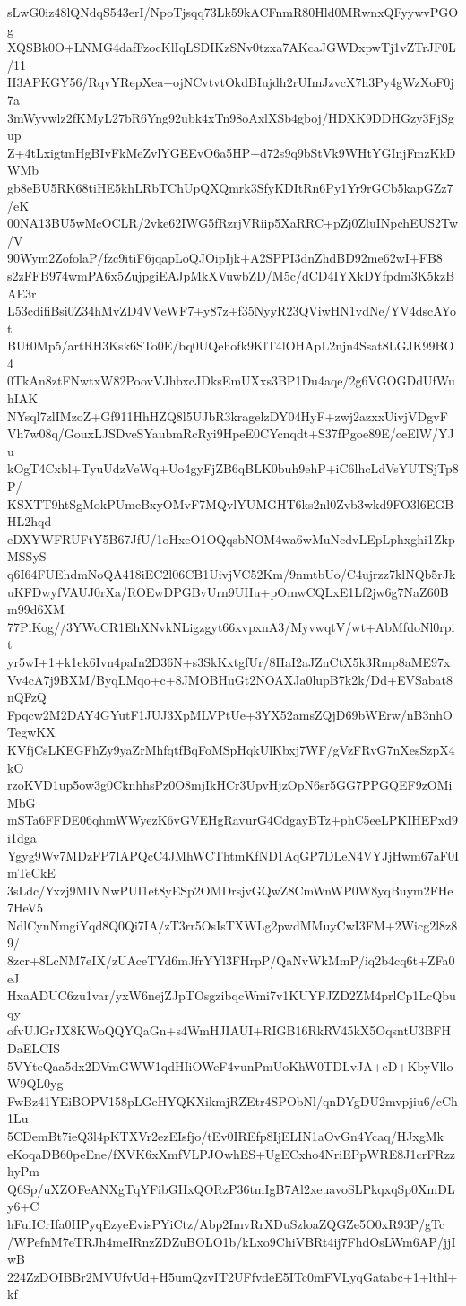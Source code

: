 sLwG0iz48lQNdqS543erI/NpoTjsqq73Lk59kACFnmR80Hld0MRwnxQFyywvPGOg
XQSBk0O+LNMG4dafFzocKlIqLSDIKzSNv0tzxa7AKcaJGWDxpwTj1vZTrJF0L/11
H3APKGY56/RqvYRepXea+ojNCvtvtOkdBIujdh2rUImJzvcX7h3Py4gWzXoF0j7a
3mWyvwlz2fKMyL27bR6Yng92ubk4xTn98oAxlXSb4gboj/HDXK9DDHGzy3FjSgup
Z+4tLxigtmHgBIvFkMeZvlYGEEvO6a5HP+d72s9q9bStVk9WHtYGInjFmzKkDWMb
gb8eBU5RK68tiHE5khLRbTChUpQXQmrk3SfyKDItRn6Py1Yr9rGCb5kapGZz7/eK
00NA13BU5wMcOCLR/2vke62IWG5fRzrjVRiip5XaRRC+pZj0ZluINpchEUS2Tw/V
90Wym2ZofolaP/fzc9itiF6jqapLoQJOipIjk+A2SPPI3dnZhdBD92me62wI+FB8
s2zFFB974wmPA6x5ZujpgiEAJpMkXVuwbZD/M5c/dCD4IYXkDYfpdm3K5kzBAE3r
L53cdifiBsi0Z34hMvZD4VVeWF7+y87z+f35NyyR23QViwHN1vdNe/YV4dscAYot
BUt0Mp5/artRH3Ksk6STo0E/bq0UQehofk9KlT4lOHApL2njn4Ssat8LGJK99BO4
0TkAn8ztFNwtxW82PoovVJhbxcJDksEmUXxs3BP1Du4aqe/2g6VGOGDdUfWuhIAK
NYsql7zlIMzoZ+Gf911HhHZQ8l5UJbR3kragelzDY04HyF+zwj2azxxUivjVDgvF
Vh7w08q/GouxLJSDveSYaubmRcRyi9HpeE0CYcnqdt+S37fPgoe89E/ceElW/YJu
kOgT4Cxbl+TyuUdzVeWq+Uo4gyFjZB6qBLK0buh9ehP+iC6lhcLdVsYUTSjTp8P/
KSXTT9htSgMokPUmeBxyOMvF7MQvlYUMGHT6ks2nl0Zvb3wkd9FO3l6EGBHL2hqd
eDXYWFRUFtY5B67JfU/1oHxeO1OQqsbNOM4wa6wMuNcdvLEpLphxghi1ZkpMSSyS
q6I64FUEhdmNoQA418iEC2l06CB1UivjVC52Km/9nmtbUo/C4ujrzz7klNQb5rJk
uKFDwyfVAUJ0rXa/ROEwDPGBvUrn9UHu+pOmwCQLxE1Lf2jw6g7NaZ60Bm99d6XM
77PiKog//3YWoCR1EhXNvkNLigzgyt66xvpxnA3/MyvwqtV/wt+AbMfdoNl0rpit
yr5wI+1+k1ek6Ivn4paIn2D36N+s3SkKxtgfUr/8HaI2aJZnCtX5k3Rmp8aME97x
Vv4cA7j9BXM/ByqLMqo+c+8JMOBHuGt2NOAXJa0lupB7k2k/Dd+EVSabat8nQFzQ
Fpqcw2M2DAY4GYutF1JUJ3XpMLVPtUe+3YX52amsZQjD69bWErw/nB3nhOTegwKX
KVfjCsLKEGFhZy9yaZrMhfqtfBqFoMSpHqkUlKbxj7WF/gVzFRvG7nXesSzpX4kO
rzoKVD1up5ow3g0CknhhsPz0O8mjIkHCr3UpvHjzOpN6sr5GG7PPGQEF9zOMiMbG
mSTa6FFDE06qhmWWyezK6vGVEHgRavurG4CdgayBTz+phC5eeLPKIHEPxd9i1dga
Ygyg9Wv7MDzFP7IAPQcC4JMhWCThtmKfND1AqGP7DLeN4VYJjHwm67aF0ImTeCkE
3sLdc/Yxzj9MIVNwPUI1et8yESp2OMDrsjvGQwZ8CmWnWP0W8yqBuym2FHe7HeV5
NdlCynNmgiYqd8Q0Qi7IA/zT3rr5OsIsTXWLg2pwdMMuyCwI3FM+2Wicg2l8z89/
8zcr+8LcNM7eIX/zUAceTYd6mJfrYYl3FHrpP/QaNvWkMmP/iq2b4cq6t+ZFa0eJ
HxaADUC6zu1var/yxW6nejZJpTOsgzibqcWmi7v1KUYFJZD2ZM4prlCp1LcQbuqy
ofvUJGrJX8KWoQQYQaGn+s4WmHJIAUI+RIGB16RkRV45kX5OqsntU3BFHDaELCIS
5VYteQaa5dx2DVmGWW1qdHIiOWeF4vunPmUoKhW0TDLvJA+eD+KbyVlloW9QL0yg
FwBz41YEiBOPV158pLGeHYQKXikmjRZEtr4SPObNl/qnDYgDU2mvpjiu6/cCh1Lu
5CDemBt7ieQ3l4pKTXVr2ezEIsfjo/tEv0IREfp8IjELIN1aOvGn4Ycaq/HJxgMk
eKoqaDB60peEne/fXVK6xXmfVLPJOwhES+UgECxho4NriEPpWRE8J1crFRzzhyPm
Q6Sp/uXZOFeANXgTqYFibGHxQORzP36tmIgB7Al2xeuavoSLPkqxqSp0XmDLy6+C
hFuiICrIfa0HPyqEzyeEvisPYiCtz/Abp2ImvRrXDuSzloaZQGZe5O0xR93P/gTc
/WPefnM7eTRJh4meIRnzZDZuBOLO1b/kLxo9ChiVBRt4ij7FhdOsLWm6AP/jjIwB
224ZzDOIBBr2MVUfvUd+H5umQzvIT2UFfvdeE5ITc0mFVLyqGatabc+1+lthl+kf
